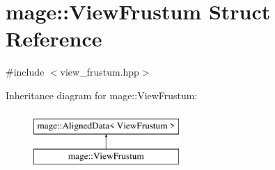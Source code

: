 \hypertarget{structmage_1_1_view_frustum}{}\section{mage\+:\+:View\+Frustum Struct Reference}
\label{structmage_1_1_view_frustum}


{\ttfamily \#include $<$view\+\_\+frustum.\+hpp$>$}

Inheritance diagram for mage\+:\+:View\+Frustum\+:\begin{figure}[H]
\begin{center}
\leavevmode
\includegraphics[height=2.000000cm]{structmage_1_1_view_frustum}
\end{center}
\end{figure}

